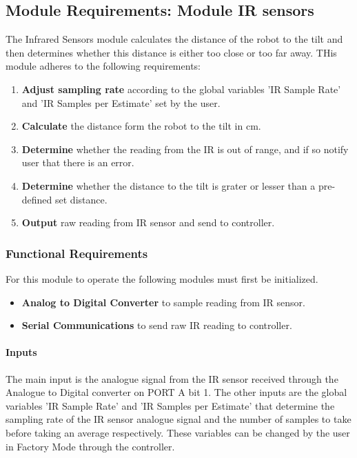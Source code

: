 \documentclass[MTRX3700report.tex]{subfiles}
\begin{document}
\subsection{Module Requirements: Module IR sensors}
The Infrared Sensors module calculates the distance of the robot to the tilt and then determines whether this distance is either too close or too far away. THis module adheres to the following requirements:
\begin{enumerate}
	\item \textbf{Adjust sampling rate} according to the global variables 'IR Sample Rate' and 'IR Samples per Estimate' set by the user.
	\item \textbf{Calculate} the distance form the robot to the tilt in cm. 
	\item \textbf{Determine} whether the reading from the IR is out of range, and if so notify user that there is an error.	
	\item \textbf{Determine} whether the distance to the tilt is grater or lesser than a pre-defined set distance.
	\item \textbf{Output} raw reading from IR sensor and send to controller.
\end{enumerate} 

\subsubsection{Functional Requirements}
For this module to operate the following modules must first be initialized.
\begin{itemize}
	\item \textbf{Analog to Digital Converter} to sample reading from IR sensor.
	\item \textbf{Serial Communications} to send raw IR reading to controller.
\end{itemize}

\paragraph{Inputs}

The main input is the analogue signal from the IR sensor received through the Analogue to Digital converter on PORT A bit 1. 
The other inputs are the global variables 'IR Sample Rate' and 'IR Samples per Estimate' that determine the sampling rate of the IR sensor analogue signal and the number of samples to take before taking an average respectively. These variables can be changed by the user in Factory Mode through the controller.  
\end{document}
